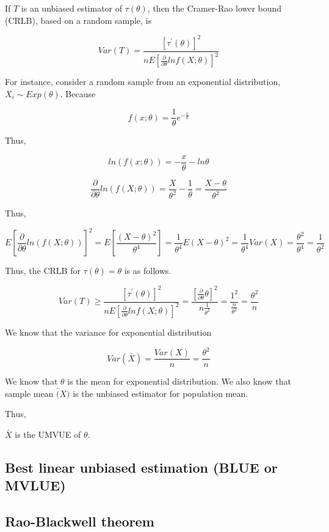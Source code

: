 \documentclass[
]{book}
\begin{document}
If \(T\) is an unbiased estimator of \(\tau(\theta)\), then the Cramer-Rao lower bound (CRLB), based on a random sample, is

\[Var(T)=\frac{[\tau^{'}(\theta)]^2}{nE[\frac{\partial}{\partial \theta} ln f(X; \theta)]^2}\]

For instance, consider a random sample from an exponential distribution, \(X_i \sim Exp(\theta)\). Because

\[f(x; \theta)=\frac{1}{\theta} e^{-\frac{x}{\theta}}\]

Thus,

\[ln(f(x;\theta))=-\frac{x}{\theta}-ln \theta\]

\[\frac{\partial}{\partial \theta} ln(f(X; \theta))=\frac{X}{\theta^2}-\frac{1}{\theta}=\frac{X-\theta}{\theta^2}\]

Thus,

\[E[\frac{\partial}{\partial \theta} ln(f(X; \theta))]^2 =E[\frac{(X-\theta)^2}{\theta^4}]=\frac{1}{\theta^4}E(X-\theta)^2=\frac{1}{\theta^4} Var(X)=\frac{\theta^2}{\theta^4}=\frac{1}{\theta^2}\]

Thus, the CRLB for \(\tau(\theta)=\theta\) is as follows.

\[Var(T) \geq \frac{[\tau^{'}(\theta)]^2}{nE[\frac{\partial}{\partial \theta} ln f(X; \theta)]^2}=\frac{[\frac{\partial }{\partial \theta}\theta]^2}{n \frac{1}{\theta^2}}=\frac{1^2}{\frac{n}{\theta^2}}=\frac{\theta^2}{n}\]

We know that the variance for exponential distribution

\[Var(\bar{X})=\frac{Var(X)}{n}=\frac{\theta^2}{n}\]

We know that \(\theta\) is the mean for exponential distribution. We also know that sample mean \(\bar(X)\) is the unbiased estimator for population mean.

Thus,

\(\bar{X}\) is the UMVUE of \(\theta\).

\hypertarget{best-linear-unbiased-estimation-blue-or-mvlue}{%
\subsection{Best linear unbiased estimation (BLUE or MVLUE)}\label{best-linear-unbiased-estimation-blue-or-mvlue}}

\hypertarget{rao-blackwell-theorem}{%
\subsection{Rao-Blackwell theorem}\label{rao-blackwell-theorem}}
\end{document}

